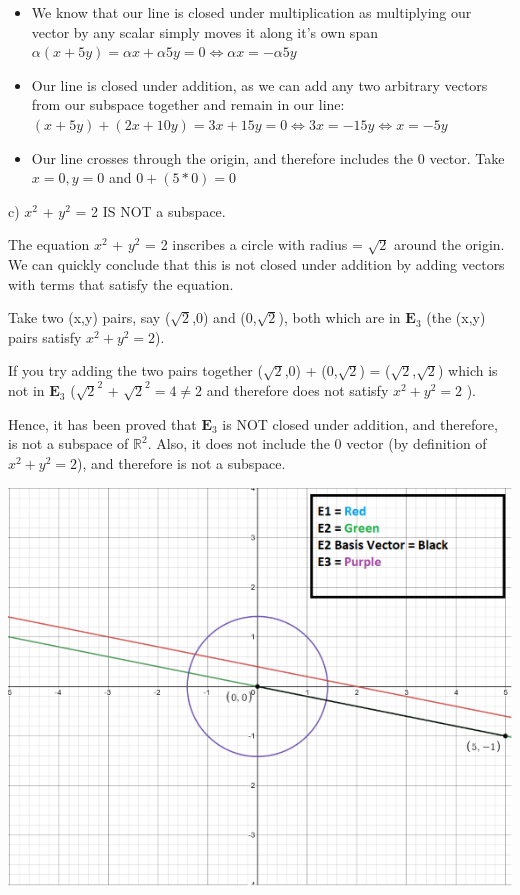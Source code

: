 \documentclass{article}
\begin{document}
\begin{itemize}
    \item We know that our line is closed under multiplication as multiplying our vector by any scalar simply moves it along it's own span
    \subitem $\alpha(x+5y) = \alpha x + \alpha 5y = 0 \Longleftrightarrow \alpha x = -\alpha 5y$
    \item Our line is closed under addition, as we can add any two arbitrary vectors from our subspace together and remain in our line: 
    \subitem $(x+5y) + (2x+10y) = 3x + 15y = 0 \Longleftrightarrow 3x = -15y \Longleftrightarrow x=-5y$
    \item Our line crosses through the origin, and therefore includes the 0 vector. 
    \subitem Take $x=0,y=0$ and  $0+(5*0)=0$
\end{itemize}


c) $x^2$ + $y^2$ = 2 IS NOT a subspace. \par
The equation $x^2$ + $y^2$ = 2 inscribes a circle with radius = $\sqrt{2}$ around the origin. We can quickly conclude that this is not closed under addition by adding vectors with terms that satisfy the equation. \par
Take two (x,y) pairs, say ($\sqrt{2}$,0) and (0,$\sqrt{2}$), both which are in $\mathbf{E}_3$ (the (x,y) pairs satisfy $x^2 + y^2 = 2$). \par
If you try adding the two pairs together ($\sqrt{2}$,0) + (0,$\sqrt{2}$) = ($\sqrt{2}$,$\sqrt{2}$) which is not in $\mathbf{E}_3$ ($\sqrt{2}^2$ + $\sqrt{2}^2 = 4 \neq 2$ and therefore does not satisfy $x^2 + y^2 = 2$ ). \par
Hence, it has been proved that $\mathbf{E}_3$ is NOT closed under addition, and therefore, is not a subspace of $\mathbb{R}^2$. Also, it does not include the 0 vector (by definition of $x^2 +y^2=2$), and therefore is not a subspace.

\includegraphics{Figure1.png}
\end{document}
